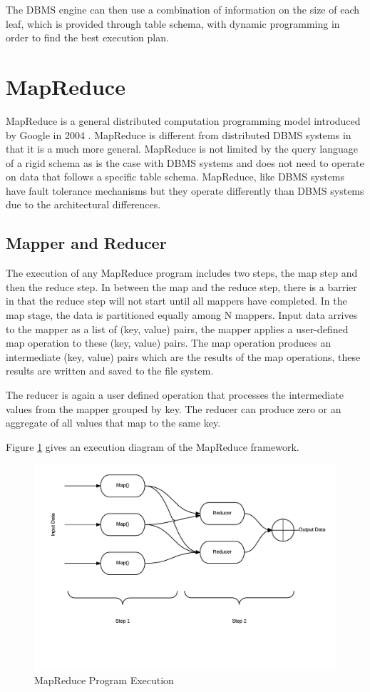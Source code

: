 \documentclass[10pt,twocolumn]{IEEEtran11}
\begin{document}
The DBMS engine can then use a combination of information on the size of each leaf, which is provided through table schema, with dynamic programming in order to find the best execution plan.

\section {MapReduce}

MapReduce is a general distributed computation programming model introduced by Google in 2004 \cite{dean2001mapreduce}.  MapReduce is different from distributed DBMS systems in that it is a much more general. MapReduce is not limited by the query language of a rigid schema as is the case with DBMS systems and does not need to operate on data that follows a specific table schema.  MapReduce, like DBMS systems have fault tolerance mechanisms but they operate differently than DBMS systems due to the architectural differences. 

\subsection{Mapper and Reducer}
The execution of any MapReduce program includes two steps, the map step and then the reduce step.  In between the map and the reduce step, there is a barrier in that the reduce step will not start until all mappers have completed.
In the map stage, the data is partitioned equally among N mappers.  Input data arrives to the mapper as a list of (key, value) pairs, the mapper applies a user-defined map operation to these (key, value) pairs.
The map operation produces an intermediate (key, value) pairs which are the results of the map operations, these results are written and saved to the file system.  
\par
The reducer is again a user defined operation that processes the intermediate values from the mapper grouped by key.  The reducer can produce zero or an aggregate of all values
that map to the same key.

Figure \ref{fig:mapReduce} gives an execution diagram of the MapReduce framework.
\begin{figure}[h]
\centering
\includegraphics[scale=0.50]{images/mapReduce.png}
\caption{MapReduce Program Execution}
\label{fig:mapReduce}
\end{figure}
\end{document}
